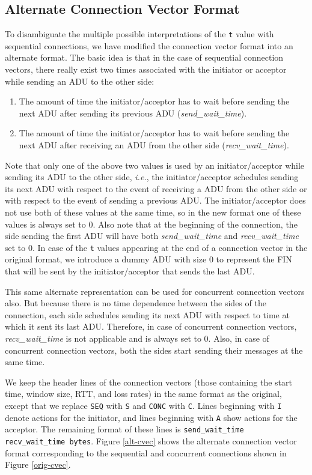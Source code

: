 \subsection{Alternate Connection Vector Format}

To disambiguate the multiple possible interpretations of the
\texttt{t} value with sequential connections, we have modified the
connection vector format into an alternate format.  The basic idea is
that in the case of sequential connection vectors, there really exist
two times associated with the initiator or acceptor while sending an
ADU to the other side:
\begin{enumerate}
\item{The amount of time the initiator/acceptor has to wait before
sending the next ADU after sending its previous ADU
(\emph{send\_wait\_time}).} 
\item{The amount of time the initiator/acceptor has to wait before
sending the next ADU after receiving an ADU from the other side
(\emph{recv\_wait\_time}).}
\end{enumerate}
Note that only one of the above two values is used by an
initiator/acceptor while sending its ADU to the other side,
\emph{i.e.}, the initiator/acceptor schedules sending its next ADU
with respect to the event of receiving a ADU from the other side or
with respect to the event of sending a previous ADU.  The
initiator/acceptor does not use both of these values at the same time,
so in the new format one of these values is always set to 0. Also note
that at the beginning of the connection, the side sending the first
ADU will have both \emph{send\_wait\_time} and \emph{recv\_wait\_time}
set to 0. In case of the \texttt{t} values appearing at the end of a
connection vector in the original format, we introduce a dummy ADU
with size 0 to represent the FIN that will be sent by the
initiator/acceptor that sends the last ADU.

This same alternate representation can be used for concurrent
connection vectors also.  But because there is no time dependence
between the sides of the connection, each side schedules sending its
next ADU with respect to time at which it sent its last
ADU. Therefore, in case of concurrent connection vectors,
\emph{recv\_wait\_time} is not applicable and is always set to
0. Also, in case of concurrent connection vectors, both the sides
start sending their messages at the same time.

We keep the header lines of the connection vectors (those containing
the start time, window size, RTT, and loss rates) in the same format
as the original, except that we replace \texttt{SEQ} with \texttt{S}
and \texttt{CONC} with \texttt{C}\@.  Lines beginning with \texttt{I}
denote actions for the initiator, and lines beginning with \texttt{A}
show actions for the acceptor.  The remaining format of these lines is
\texttt{send\_wait\_time recv\_wait\_time bytes}.  Figure
\ref{alt-cvec} shows the alternate connection vector format
corresponding to the sequential and concurrent connections shown in
Figure \ref{orig-cvec}.

